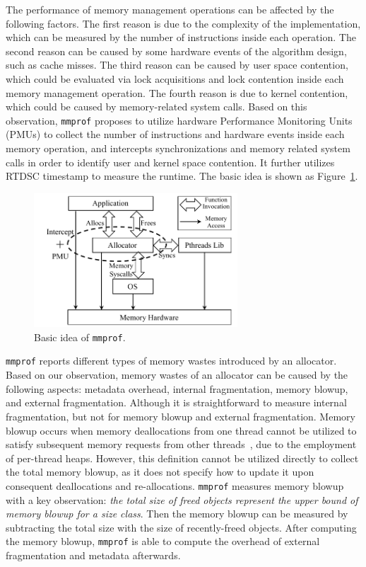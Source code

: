 \documentclass[pageno]{jpaper}
\newcommand{\MP}{\texttt{mmprof}}
\begin{document}
The performance of memory management operations can be affected by the following factors. The first reason is due to the complexity of the implementation, which can be measured by the number of instructions inside each operation. The second reason can be caused by some hardware events of the algorithm design, such as cache misses. The third reason can be caused by user space contention, which could be evaluated via lock acquisitions and lock contention inside each memory management operation. The fourth reason is due to kernel contention, which could be caused by memory-related system calls. Based on this observation, \MP{} proposes to utilize hardware Performance Monitoring Units (PMUs) to collect the number of instructions and hardware events inside each memory operation, and intercepts synchronizations and memory related system calls in order to identify user and kernel space contention. It further utilizes RTDSC timestamp to measure the runtime. The basic idea is shown as Figure~\ref{fig:basicidea}. 

\begin{figure}[!ht]
\centering
\includegraphics[width=3in]{figures/basicidea}
\caption{Basic idea of \texttt{mmprof}.\label{fig:basicidea}}
\end{figure}


\MP{} reports different types of memory wastes introduced by an allocator. Based on our observation, memory wastes of an allocator can be caused by the following aspects: metadata overhead, internal fragmentation, memory blowup, and external fragmentation.  Although it is straightforward to measure internal fragmentation, but not for memory blowup and external fragmentation. Memory blowup occurs when memory deallocations from one thread cannot be utilized to satisfy subsequent memory requests from other threads~\cite{Hoard}, due to the employment of per-thread heaps. However, this definition cannot be utilized directly to collect the total memory blowup, as it does not specify how to update it upon consequent deallocations and re-allocations. \MP{} measures memory blowup with a key observation: \textit{the total size of freed objects represent the upper bound of memory blowup for a size class}. Then the memory blowup can be measured by subtracting the total size with the size of recently-freed objects. After computing the memory blowup, \MP{} is able to compute the overhead of external fragmentation and metadata afterwards. 
 
\end{document}
